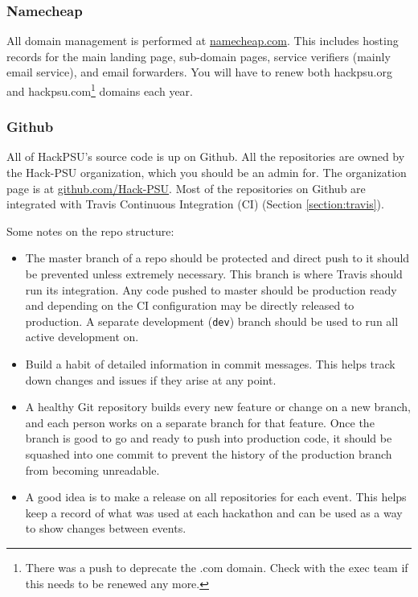 \documentclass[twoside, 12pt]{article}
\newenvironment{tightitemize} %
{\begin{itemize}\itemsep1pt \parskip0pt \parsep0pt}
{\end{itemize}\vspace{-\topsep}}
\begin{document}
\subsubsection{Namecheap}
\par All domain management is performed at \href{https://namecheap.com}{namecheap.com}. This includes hosting records for the main landing page, sub-domain pages, service verifiers (mainly email service), and email forwarders. You will have to renew both hackpsu.org and hackpsu.com\footnote{There was a push to deprecate the .com domain. Check with the exec team if this needs to be renewed any more.} domains each year.

\subsubsection{Github}
\par All of HackPSU's source code is up on Github. All the repositories are owned by the Hack-PSU organization, which you should be an admin for. The organization page is at \href{https://github.com/Hack-PSU}{github.com/Hack-PSU}. Most of the repositories on Github are integrated with Travis Continuous Integration (CI) (Section \ref{section:travis}).
\par Some notes on the repo structure:
\begin{tightitemize}
    \item The master branch of a repo should be protected and direct push to it should be prevented unless extremely necessary. This branch is where Travis should run its integration. Any code pushed to master should be production ready and depending on the CI configuration may be directly released to production. A separate development (\texttt{dev}) branch should be used to run all active development on.
    \item Build a habit of detailed information in commit messages. This helps track down changes and issues if they arise at any point.
    \item A healthy Git repository builds every new feature or change on a new branch, and each person works on a separate branch for that feature. Once the branch is good to go and ready to push into production code, it should be squashed into one commit to prevent the history of the production branch from becoming unreadable.
    \item A good idea is to make a release on all repositories for each event.  This helps keep a record of what was used at each hackathon and can be used as a way to show changes between events.
\end{tightitemize}
\end{document}

